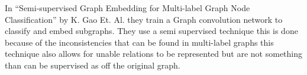 In “Semi-supervised Graph Embedding for Multi-label Graph Node Classification” by K. Gao Et. Al.\cite{10.1007/978-3-030-34223-4_35} they train a Graph convolution network to classify and embed subgraphs. They use a semi supervised technique this is done because of the inconsistencies that can be found in multi-label graphs this technique also allows for unable relations to be represented but are not something than can be supervised as off the original graph.
